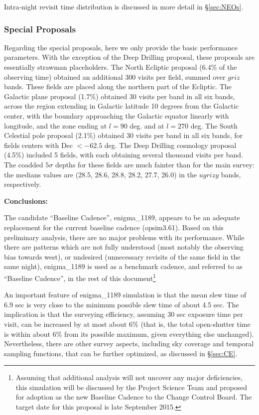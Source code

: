 \documentclass[manuscript]{article}
\begin{document}
Intra-night revisit time distribution is discussed in more detail in \S\ref{sec:NEOs}. 



\subsubsection{Special Proposals} 

Regarding the special proposals, here we only provide the basic performance parameters.
With the exception of the Deep Drilling proposal, these proposals are essentially strawman
placeholders. The North Ecliptic proposal (6.4\% of the observing time) obtained an additional 
300 visits per field, summed over $griz$ bands. These fields are placed along the northern
part of the Ecliptic. The Galactic plane proposal (1.7\%) obtained 30 visits per band in all 
six bands, across the region extending in Galactic latitude 10 degrees from the Galactic center, 
with the boundary approaching the Galactic equator linearly with longitude, and the zone 
ending at $l=90$ deg. and at $l=270$ deg. The South Celestial pole proposal (2.1\%) obtained 
30 visits per band in all six bands, for fields centers with Dec $< -62.5$ deg. 
The Deep Drilling cosmology proposal (4.5\%) included 5 fields, with each obtaining several
thousand visits per band. The coadded $5\sigma$ depths for these fields are much fainter than 
for the main survey: the medians values are (28.5, 28.6, 28.8, 28.2, 27.7, 26.0) in the $ugrizy$ 
bands, respectively. 


\vskip 0.2in
{\bf Conclusions:} 

The candidate “Baseline Cadence”, enigma\_1189, appears to be an adequate replacement 
for the current baseline cadence (opsim3.61). Based on this preliminary analysis, 
there are no major problems with its performance. While there are patterns which are
not fully understood (most notably the observing bias towards west),  or undesired 
(unnecessary revisits of the same field in the same night), enigma\_1189 is used as a 
benchmark cadence, and referred to as ``Baseline Cadence'',  in the rest of this 
document\footnote{Assuming that additional analysis will not uncover any major
deficiencies, this simulation will be discussed by the Project Science Team and
proposed for adoption as the new Baseline Cadence to the Change Control Board.
The target date for this proposal is late September 2015.}

An important feature of enigma\_1189 simulation is that the mean slew time of 
6.9 sec is very close to the minimum possible slew time of about 4.5 sec. 
The implication is that the surveying efficiency, assuming 30 sec exposure time per visit, 
can be increased by at most about 6\% (that is, the total open-shutter time is within
about 6\% from its possible maximum, given everything else unchanged). Nevertheless, 
there are other survey aspects, including sky coverage and temporal sampling functions, 
that can be further optimized, as discussed in \S\ref{sec:CE}. 
\end{document}
